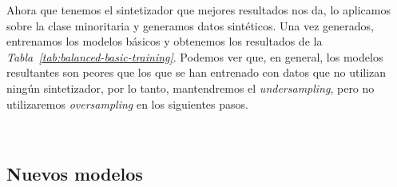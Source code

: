Ahora que tenemos el sintetizador que mejores resultados nos da, lo aplicamos sobre la clase minoritaria y generamos datos sintéticos. Una vez generados, entrenamos los modelos básicos y obtenemos los resultados de la \textit{Tabla\ \ref{tab:balanced-basic-training}}. Podemos ver que, en general, los modelos resultantes son peores que los que se han entrenado con datos que no utilizan ningún sintetizador, por lo tanto, mantendremos el \textit{undersampling}, pero no utilizaremos \textit{oversampling} en los siguientes pasos.


\begin{table}[!ht]
    \centering
    \caption{Resultados de entrenar los modelos básicos habiendo balanceado el \textit{dataset}. Fuente propia.}\ \label{tab:balanced-basic-training}
\end{table}

\clearpage
\subsection{Nuevos modelos}


